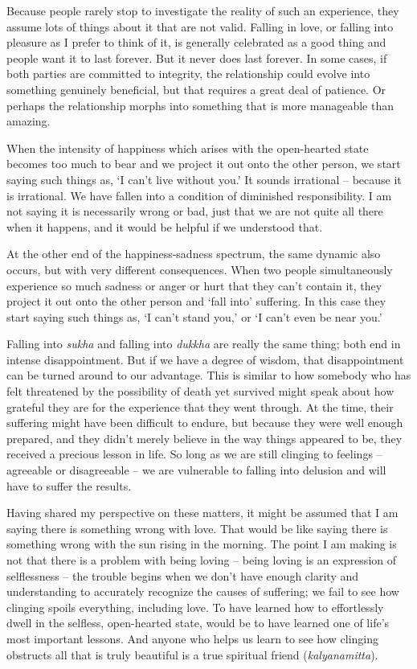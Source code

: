 \enlargethispage*{2\baselineskip}

Because people rarely stop to investigate the reality of such an
experience, they assume lots of things about it that are not valid.
Falling in love, or falling into pleasure as I prefer to think of it, is
generally celebrated as a good thing and people want it to last forever.
But it never does last forever. In some cases, if both parties are
committed to integrity, the relationship could evolve into something
genuinely beneficial, but that requires a great deal of patience. Or
perhaps the relationship morphs into something that is more manageable
than amazing.

When the intensity of happiness which arises with the open-hearted state
becomes too much to bear and we project it out onto the other person, we
start saying such things as, `I can't live without you.' It sounds
irrational -- because it is irrational. We have fallen into a condition
of diminished responsibility. I am not saying it is necessarily wrong or
bad, just that we are not quite all there when it happens, and it would
be helpful if we understood that.

At the other end of the happiness-sadness spectrum, the same dynamic
also occurs, but with very different consequences. When two people
simultaneously experience so much sadness or anger or hurt that they
can't contain it, they project it out onto the other person and `fall
into' suffering. In this case they start saying such things as, `I can't
stand you,' or `I can't even be near you.'

Falling into \emph{sukha} and falling into \emph{dukkha} are really the
same thing; both end in intense disappointment. But if we have a degree
of wisdom, that disappointment can be turned around to our advantage.
This is similar to how somebody who has felt threatened by the
possibility of death yet survived might speak about how grateful they
are for the experience that they went through. At the time, their
suffering might have been difficult to endure, but because they were
well enough prepared, and they didn't merely believe in the way things
appeared to be, they received a precious lesson in life. So long as we
are still clinging to feelings -- agreeable or disagreeable -- we are
vulnerable to falling into delusion and will have to suffer the results.

Having shared my perspective on these matters, it might be assumed that
I am saying there is something wrong with love. That would be like
saying there is something wrong with the sun rising in the morning. The
point I am making is not that there is a problem with being loving --
being loving is an expression of selflessness -- the trouble begins when
we don't have enough clarity and understanding to accurately recognize
the causes of suffering; we fail to see how clinging spoils everything,
including love. To have learned how to effortlessly dwell in the
selfless, open-hearted state, would be to have learned one of life's
most important lessons. And anyone who helps us learn to see how
clinging obstructs all that is truly beautiful is a true spiritual
friend (\emph{kalyanamitta}).

